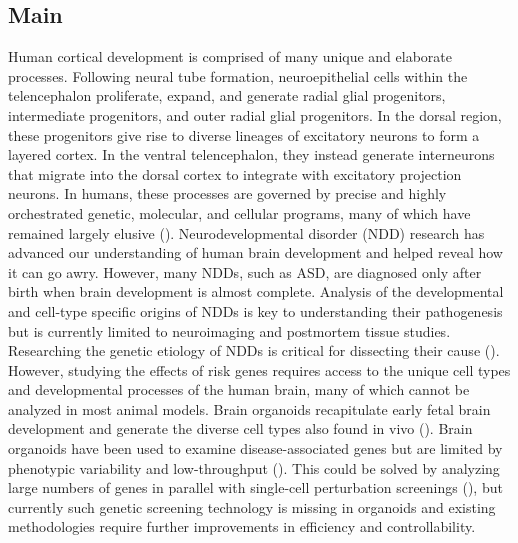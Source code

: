 \subsection{Main}

Human cortical development is comprised of many unique and elaborate processes. Following neural tube formation, neuroepithelial cells within the telencephalon proliferate, expand, and generate radial glial progenitors, intermediate progenitors, and outer radial glial progenitors. In the dorsal region, these progenitors give rise to diverse lineages of excitatory neurons to form a layered cortex. In the ventral telencephalon, they instead generate interneurons that migrate into the dorsal cortex to integrate with excitatory projection neurons. In humans, these processes are governed by precise and highly orchestrated genetic, molecular, and cellular programs, many of which have remained largely elusive (\cite{libe-philippot_cellular_2021}). 
Neurodevelopmental disorder (NDD) research has advanced our understanding of human brain development and helped reveal how it can go awry. However, many NDDs, such as ASD, are diagnosed only after birth when brain development is almost complete. Analysis of the developmental and cell-type specific origins of NDDs is key to understanding their pathogenesis but is currently limited to neuroimaging and postmortem tissue studies. 
Researching the genetic etiology of NDDs is critical for dissecting their cause (\cite{hu_diverse_2014,satterstrom_large-scale_2020,torre-ubieta_advancing_2016}). However, studying the effects of risk genes requires access to the unique cell types and developmental processes of the human brain, many of which cannot be analyzed in most animal models. Brain organoids recapitulate early fetal brain development and generate the diverse cell types also found in vivo (\cite{lancaster_cerebral_2013}). Brain organoids have been used to examine disease-associated genes but are limited by phenotypic variability and low-throughput (\cite{lancaster_cerebral_2013,mariani_modeling_2012,paulsen_autism_2022}). This could be solved by analyzing large numbers of genes in parallel with single-cell perturbation screenings (\cite{dixit_perturb-seq_2016,jaitin_massively_2014,adamson_multiplexed_2016}), but currently such genetic screening technology is missing in organoids and existing methodologies require further improvements in efficiency and controllability. 
